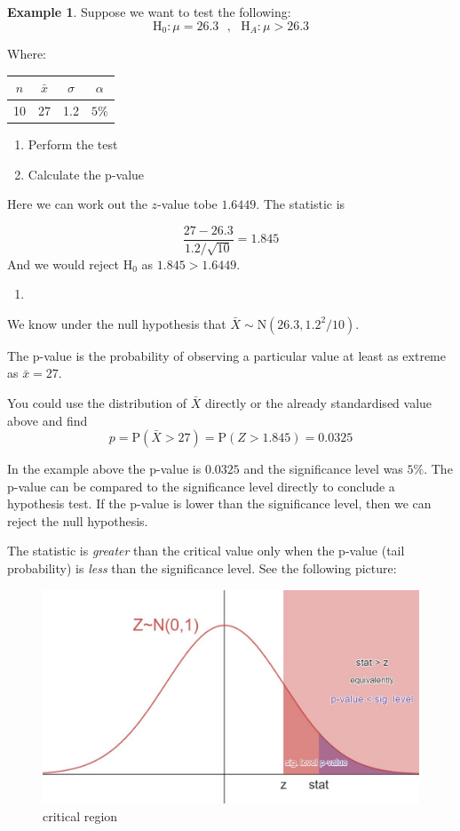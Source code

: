 \documentclass[
]{book}
\theoremstyle{definition}
\theoremstyle{definition}
\newtheorem{example}{Example}[chapter]
\theoremstyle{definition}
\theoremstyle{definition}
\theoremstyle{remark}
\begin{document}
\begin{example}
Suppose we want to test the following:
\[\text{H}_0:\mu = 26.3 \ \ \ , \ \ \ \text{H}_A: \mu >26.3\]

Where:

\begin{longtable}[]{@{}cccc@{}}
\toprule
\(n\) & \(\bar{x}\) & \(\sigma\) & \(\alpha\)\tabularnewline
\midrule
\endhead
10 & 27 & 1.2 & \(5\%\)\tabularnewline
\bottomrule
\end{longtable}

\begin{enumerate}
\def\labelenumi{\alph{enumi})}
\item
  Perform the test
\item
  Calculate the p-value
\end{enumerate}

Here we can work out the \(z\)-value tobe \(1.6449\). The statistic is

\[\frac{27 - 26.3}{1.2/\sqrt{10}} = 1.845\]
And we would reject \(\text{H}_0\) as \(1.845 > 1.6449\).

\begin{enumerate}
\def\labelenumi{\alph{enumi})}
\setcounter{enumi}{1}
\item
\end{enumerate}

We know under the null hypothesis that \(\bar{X} \sim \text{N}(26.3, 1.2^2/10)\).

The p-value is the probability of observing a particular value at least as extreme as \(\bar{x}=27\).

You could use the distribution of \(\bar{X}\) directly or the already standardised value above and find \[p = \text{P}(\bar{X} >27) = \text{P}(Z>1.845) = 0.0325 \]
\end{example}

In the example above the p-value is \(0.0325\) and the significance level was \(5\%\). The p-value can be compared to the significance level directly to conclude a hypothesis test. If the p-value is lower than the significance level, then we can reject the null hypothesis.

The statistic is \emph{greater} than the critical value only when the p-value (tail probability) is \emph{less} than the significance level. See the following picture:

\begin{figure}

{\centering \includegraphics[width=0.75\linewidth]{./figures/p-value} 

}

\caption{critical region}\label{fig:pval}
\end{figure}
\end{document}
